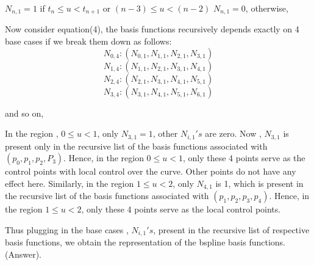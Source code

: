 \documentclass{article}
\begin{document}
$N_{n,1} = 1$ if $t_n \leq u < t_{n+1}$ or $(n-3) \leq u < (n-2)$ \newline
$N_{n,1} = 0$, otherwise, \newline \newline

Now consider equation(4), the basis functions recursively depends exactly on 4 base cases if we break them down as follows: \newline
\[ N_{0,4} : (N_{0,1}, N_{1,1}, N_{2,1}, N_{3,1})\]
\[ N_{1,4} : ( N_{1,1}, N_{2,1}, N_{3,1}, N_{4,1})\]
\[ N_{2,4} : ( N_{2,1}, N_{3,1}, N_{4,1}, N_{5,1})\]
\[ N_{3,4} : ( N_{3,1}, N_{4,1}, N_{5,1}, N_{6,1})\]

and so on, \newline

In the region , $0 \leq u < 1$, only $N_{3,1}=1$, other $N_{i,1}'s$ are zero. Now , $N_{3,1}$ is present only in the recursive list of the basis functions associated with  $(p_0, p_1, p_2, P_3)$. Hence, in the region $0 \leq u < 1$, only these 4 points serve as the control points with local control over the curve. Other points do not have any effect here. Similarly, in the region $1 \leq u < 2$, only $N_{4,1}$ is 1, which is present in the recursive list of the basis functions associated with $(p_1, p_2, p_3,p_4)$. Hence, in the region $1 \leq u < 2$, only these 4 points serve as the local control points. \newline

Thus plugging in the base cases , $N_{i,1}'s$, present in the recursive list of respective basis functions, we obtain the representation of the bspline basis functions. (Answer). \newline
\end{document}
